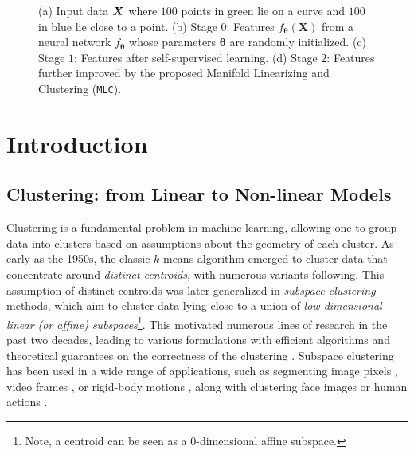 \documentclass[10pt,twocolumn,letterpaper]{article}
\newcommand{\ours}{MLC}
\newcommand{\mours}{\texttt{\ours}}
\begin{document}
\begin{figure}[t]
\begin{subfigure}{0.49\linewidth}
       \caption{}
       \label{fig:sim1-d}
     \end{subfigure}
     \label{fig:sim1}
     \caption{(a) Input data ${\bm{X}}$ where $100$ points in green lie on a curve and $100$ in blue lie close to a point. (b) Stage $0$: Features $f_{\boldsymbol{\theta}}(\boldsymbol{X})$ from a neural network $f_{\boldsymbol{\theta}}$ whose parameters $\boldsymbol{\theta}$ are randomly initialized. (c) Stage $1$: Features after self-supervised learning. (d) Stage $2$: Features further improved by the proposed Manifold Linearizing and Clustering (\mours).
     }
   \end{figure}

  
   \section{Introduction} \label{sec:intro}
   \subsection{Clustering: from Linear to Non-linear Models} \label{sec:intro-sc}
   Clustering is a fundamental problem in machine learning, allowing one to group data into clusters based on assumptions about the geometry of each cluster. As early as the 1950s, the classic $k$-means \cite{Lloyd1957-wk,Forgey1965-xd,Jancey1966-tj,McQueen1967-ru} algorithm emerged to cluster data that concentrate around \textit{distinct centroids}, with numerous
 variants \cite{Bradley1996-cz,Arthur2006-is,Bahmani2012-ip} following. This assumption of distinct centroids was later generalized in \textit{subspace clustering} methods, %
 which aim to cluster data lying close to a union of \textit{low-dimensional linear (or affine) subspaces}\footnote{\label{fn:kmeans-as-subspace}Note, a centroid can be seen as a $0$-dimensional affine subspace.}. This motivated numerous lines of research in the past two decades, leading to various formulations \cite{Elhamifar2009-bw,Elhamifar2013-de,Lu2012-lz,Liu2013-sl,Heckel2015-hm,You2016-ob,Lipor2017-tn,lane2019classifying} with efficient algorithms \cite{You2016-na,You2016-ob,Chen2018-qc} and theoretical guarantees on the correctness of the clustering \cite{Soltanolkotabi2012-kp,Soltanolkotabi2014-rp,Wang2015-yc,Wang2016-gs,Li2018-qr,Tsakiris2018-ej,You2019-kb,Robinson2019-da,Wang2022-rt}. Subspace clustering has been used in a wide range of applications, such as segmenting image pixels \cite{Ma2007-dx,Wang2015-vr,Liu2020-mg}, video frames \cite{Vidal2005-ah,Tierney2014-og,Li2015-wi}, or rigid-body motions \cite[\S 11]{Vidal2016-zp}, along with clustering face images \cite{Georghiades2001-xm,Ho2003-uk,Elhamifar2013-de} or human actions \cite{Wu2016-yv,Gholami2017-nz,Paoletti2021-qh}. 
\end{document}
